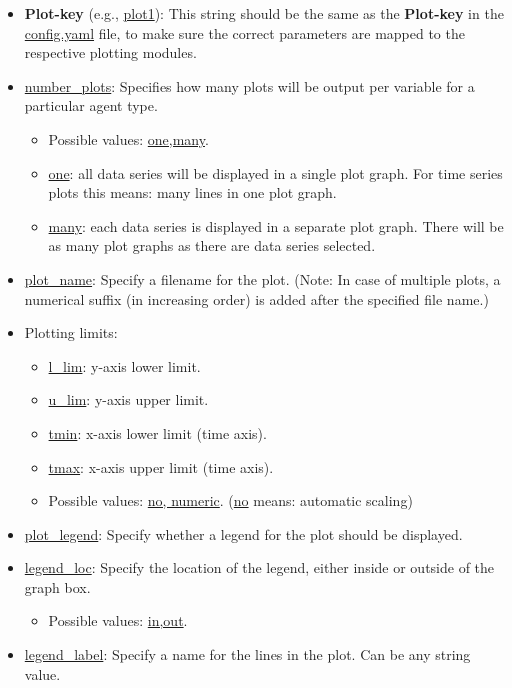 \documentclass[10pt,a4paper]{article}
\begin{document}
\begin{itemize}
\item \textbf{Plot-key} (e.g., \url{plot1}): This string should be the same as the \textbf{Plot-key} in the \url{config.yaml} file, to make sure the correct parameters are mapped to the respective plotting modules.

\item \url{number_plots}: Specifies how many plots will be output per variable for a particular agent type. 
\begin{itemize}
\item Possible values: \url{one,many}.
\item \url{one}: all data series will be displayed in a single plot graph. For time series plots this means: many lines in one plot graph.
\item \url{many}: each data series is displayed in a separate plot graph. There will be as many plot graphs as there are data series selected.
\end{itemize}

\item \url{plot_name}: Specify a filename for the plot.
(Note: In case of multiple plots, a numerical suffix (in increasing order) is added after the specified file name.)

\item Plotting limits:
\begin{itemize}
\item \url{l_lim}: y-axis lower limit.
\item \url{u_lim}: y-axis upper limit. 
\item \url{tmin}:  x-axis lower limit (time axis).
\item \url{tmax}: x-axis upper limit (time axis).
\item Possible values: \url{no, numeric}. (\url{no} means: automatic scaling)
\end{itemize}

\item \url{plot_legend}: Specify whether a legend for the plot should be displayed.

\item \url{legend_loc}: Specify the location of the legend, either inside or outside of the graph box.
\begin{itemize}
\item Possible values: \url{in,out}.
\end{itemize}

\item \url{legend_label}: Specify a name for the lines in the plot. Can be any string value.


\end{itemize}
\end{document}
